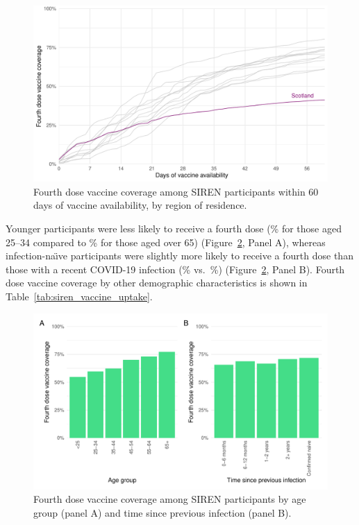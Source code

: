 \begin{figure}[htbp!]
    \centering
    \includegraphics[width=\textwidth]{vaccination_history_region.pdf}
    \caption[Fourth dose vaccine coverage among SIREN participants within 60 days of vaccine availability, by region of residence]{Fourth dose vaccine coverage among SIREN participants within 60 days of vaccine availability, by region of residence.}\label{fig:vaccination_history_region}
\end{figure}

Younger participants were less likely to receive a fourth dose (\% for those aged 25--34 compared to \% for those aged over 65) (Figure~\ref{fig:vaccination_demog}, Panel A), whereas infection-na\"{\i}ve participants were slightly more likely to receive a fourth dose than those with a recent COVID-19 infection (\% vs.\ \%) (Figure~\ref{fig:vaccination_demog}, Panel B). Fourth dose vaccine coverage by other demographic characteristics is shown in Table~\ref{tab:siren_vaccine_uptake}.

\begin{figure}[htbp!]
    \centering
    \includegraphics[width=\textwidth]{vaccination_demog.pdf}
    \caption[Fourth dose vaccine coverage among SIREN participants by age group and time since previous infection]{Fourth dose vaccine coverage among SIREN participants by age group (panel A) and time since previous infection (panel B).}\label{fig:vaccination_demog}
\end{figure}

